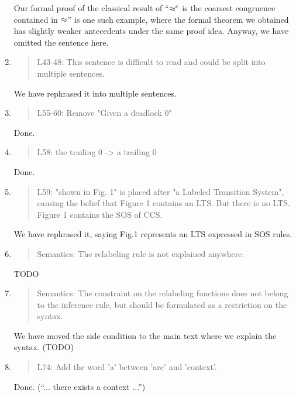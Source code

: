 \begin{enumerate}
  Our formal proof of the classical result of ``$\mathrel{\approx^{\rm{c}}}$ is the
  coarsest congruence contained in $\approx$'' is one such example, where
  the formal theorem we obtained has slightly weaker antecedents under
  the same proof idea. Anyway, we have omitted the sentence here.

\item \begin{quote}
    L43-48: This sentence is difficult to read and could be split into multiple sentences.
  \end{quote}

  We have rephrased it into multiple sentences.
  
\item \begin{quote}
    L55-60: Remove "Given a deadlock 0"
  \end{quote}
  Done.
  
\item \begin{quote}
    L58: the trailing 0 -> a trailing 0
  \end{quote}
  Done.
  
\item \begin{quote}
    L59: "shown in Fig. 1" is placed after "a Labeled Transition
    System", causing the belief that Figure 1 contains an LTS. 
    But there is no LTS. Figure 1 contains the SOS of CCS.
  \end{quote}

  We have rephrased it, saying Fig.1 represents an LTS expressed in SOS rules.

\item \begin{quote}
    Semantics: The relabeling rule is not explained anywhere.
  \end{quote}

  TODO
  
\item \begin{quote}
    Semantics: The constraint on the relabeling functions does not belong to the inference rule, but should be formulated as a restriction on the syntax.
  \end{quote}
  We have moved the side condition to the main text where we explain
  the syntax. (TODO)
  
\item \begin{quote}
    L74: Add the word 'a' between 'are' and 'context'.
  \end{quote}
  Done. (``... there exists a context ...'')
  

\end{enumerate}
